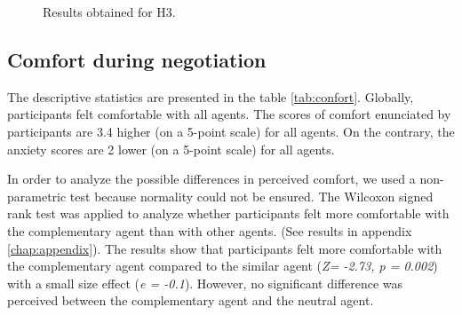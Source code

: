 \documentclass{llncs}
\begin{document}
\begin{figure}[!tbh]
	
	
	
	\caption{Results obtained for H3.}
	\label{fig:tour}
\end{figure}
%	

\subsection{Comfort during negotiation}

The descriptive statistics are presented in the table \ref{tab:confort}. Globally, participants felt comfortable with all agents.
The scores of comfort enunciated by participants are 3.4 higher (on a 5-point scale) for all agents. On the contrary, the anxiety scores are 2 lower (on a 5-point scale) for all agents. 

In order to analyze the possible differences in perceived comfort, we used a non-parametric test because normality could not be ensured. The Wilcoxon signed rank test was applied to analyze whether participants felt more comfortable with the complementary agent than with other agents. (See results in appendix \ref{chap:appendix}). 
The results show that participants felt more comfortable with the complementary agent compared to the similar agent (\emph{Z= -2.73, p = 0.002})
with a small size effect (\emph{e = -0.1}). However, no significant difference was perceived between the complementary agent and the neutral agent. 
\end{document}
